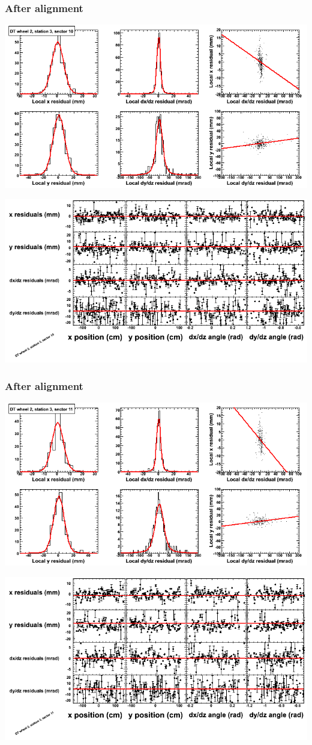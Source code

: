 \documentclass[compress]{beamer}
\begin{document}
\begin{frame}
\frametitle{After alignment}
\includegraphics[width=0.7\linewidth]{NOV4_fitfunctions/MBwhEst3sec10_bellcurves.png}

\includegraphics[width=0.7\linewidth]{NOV4_fitfunctions/MBwhEst3sec10_polynomials.png}
\end{frame}

\begin{frame}
\frametitle{After alignment}
\includegraphics[width=0.7\linewidth]{NOV4_fitfunctions/MBwhEst3sec11_bellcurves.png}

\includegraphics[width=0.7\linewidth]{NOV4_fitfunctions/MBwhEst3sec11_polynomials.png}
\end{frame}
\end{document}

